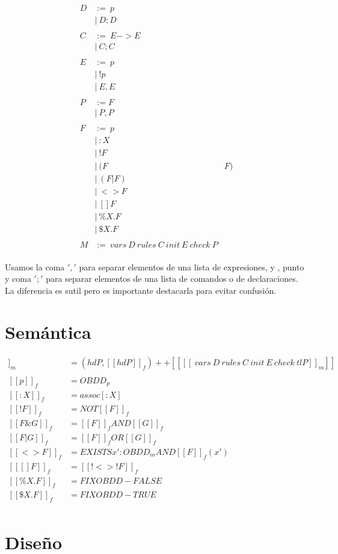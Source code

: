 \begin{align*}
D &:=\ p \\
   &|\ D;D \\
\\
C &:=\ E->E \\
   &|\ C;C \\
\\
E &:=\ p \\
   &|\ !p \\
   &|\ E,E \\
\\
P &:= F \\
   &|\ P,P \\
\\
F &:=\ p \\
   &|\ :X \\
   &|\ !F \\
   &|\ (F & F) \\
   &|\ (F | F) \\
   &|\ <>F \\
   &|\ []F \\
   &|\ \%X.F \\
   &|\ \$X.F \\ 
\\
M &:=\ vars\ D\ rules\ C\ init\ E\ check\ P \\
\end{align*}

Usamos la coma $','$ para separar elementos de una lista de expresiones, y , punto y coma $';'$ para separar elementos de una lista de comandos o de declaraciones. La diferencia es sutil pero es importante destacarla para evitar confusión.

\section{Semántica}

\begin{align*}
[[\ vars\ D\ rules\ C\ init\ E\ check\ P ]]_{m} &= (hd P,[[hd P]]_{f}) ++ [[[[\ vars\ D\ rules\ C\ init\ E\ check\ tl P ]]_{m}]] \\
\\
[[p]]_{f} &= OBDD_{p} \\
[[:X]]_{f} &= assoc[:X] \\
[[!F]]_{f} &= NOT [[F]]_{f} \\
[[F \& G]]_{f} &= [[F]]_{f} AND  [[G]]_{f} \\
[[F | G]]_{f} &= [[F]]_{f} OR  [[G]]_{f} \\
[[<>F]]_{f} &= EXISTS x' : OBDD_{m} AND [[F]]_{f}(x') \\
[[[]F]]_{f} &= [[!<>!F]]_{f} \\
[[\%X.F]]_{f} &= FIX OBDD-FALSE \\
[[\$X.F]]_{f} &= FIX OBDD-TRUE \\
\end{align*}



\section{Diseño}
